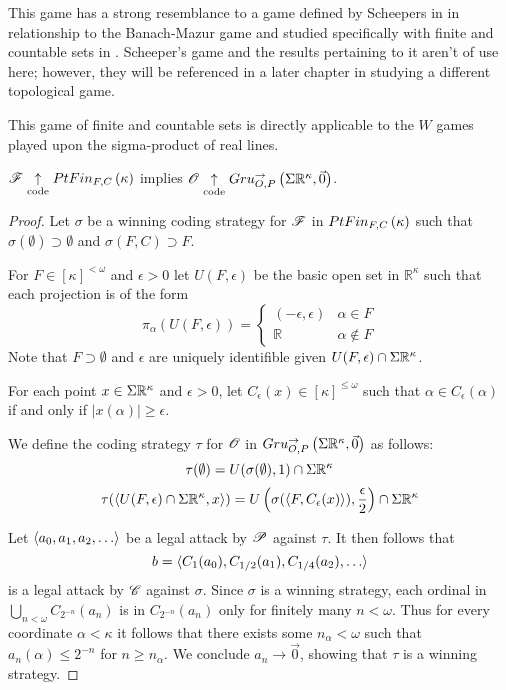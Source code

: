 This game has a strong resemblance to a game defined by Scheepers in
\cite{MR1129143} in relationship to the Banach-Mazur game and studied
specifically with finite and countable sets in \cite{MR1183703}. Scheeper's
game and the results pertaining to it aren't of use here; however, they will be
referenced in a later chapter in studying a different topological game.

This game of finite and countable sets is directly applicable to the $W$
games played upon the sigma-product of real lines.

\begin{lem}
  $\mathscr{F} \underset{\text{code}}{\uparrow} PtFin_{F,C}\left({\kappa}\right)$ implies
  $\mathscr{O} \underset{\text{code}}{\uparrow} Gru_{O,P}^{\to}\left({\Sigma\mathbb{R}^{\kappa}},{\vec0}\right)$.
\end{lem}

\begin{proof}
  Let $\sigma$ be a winning coding strategy for $\mathscr{F}$ in $PtFin_{F,C}\left({\kappa}\right)$
  such that $\sigma(\emptyset)\supset\emptyset$ and $\sigma(F,C)\supset F$.

  For $F\in[\kappa]^{<\omega}$ and $\epsilon>0$ let $U(F,\epsilon)$ be the
  basic open set in $\mathbb{R}^\kappa$ such that each projection is of the form
  \[
    \pi_\alpha(U(F,\epsilon)) =
    \left\{
      \begin{array}{ll}
        (-\epsilon,\epsilon) & \alpha\in F\\
        \mathbb{R} & \alpha\not\in F
      \end{array}
    \right.
  \]
  Note that $F\supset\emptyset$ and $\epsilon$ are uniquely identifible given
  $U(F,\epsilon)\cap\Sigma\mathbb{R}^{\kappa}$.

  For each point $x\in\Sigma\mathbb{R}^{\kappa}$ and $\epsilon> 0$, let
  $C_\epsilon(x)\in[\kappa]^{\leq\omega}$
  such that $\alpha\in C_\epsilon(\alpha)$ if and only if
  $|x(\alpha)|\geq\epsilon$.

  We define the coding strategy $\tau$ for $\mathscr{O}$ in
  $Gru_{O,P}^{\to}\left({\Sigma\mathbb{R}^{\kappa}},{\vec0}\right)$ as follows:
  \[
    \tau(\emptyset)
      =
    U(\sigma(\emptyset),1) \cap \Sigma\mathbb{R}^{\kappa}
  \]
  \[
    \tau(\langle U(F,\epsilon)\cap\Sigma\mathbb{R}^{\kappa},x\rangle)
      =
    U\left(\sigma(\langle F,C_{\epsilon}(x)\rangle),\frac{\epsilon}{2}\right)
      \cap
    \Sigma\mathbb{R}^{\kappa}
  \]

  Let $\<a_0,a_1,a_2,\dots\>$ be a legal attack by $\mathscr{P}$ against $\tau$. It
  then follows that
    \[
      b=\<C_{1}(a_0),C_{1/2}(a_1),C_{1/4}(a_2),\dots\>
    \]
  is a
  legal attack by $\mathscr{C}$ against $\sigma$. Since $\sigma$ is a winning
  strategy, each ordinal in $\bigcup_{n<\omega} C_{2^{-n}}(a_n)$ is in
  $C_{2^{-n}}(a_n)$ only for finitely many $n<\omega$. Thus for every coordinate
  $\alpha<\kappa$ it follows that there exists some $n_\alpha<\omega$ such that
  $a_{n}(\alpha)\leq 2^{-n}$ for $n\geq n_\alpha$. We conclude $a_n\to\vec0$,
  showing that $\tau$ is a winning strategy.
\end{proof}

